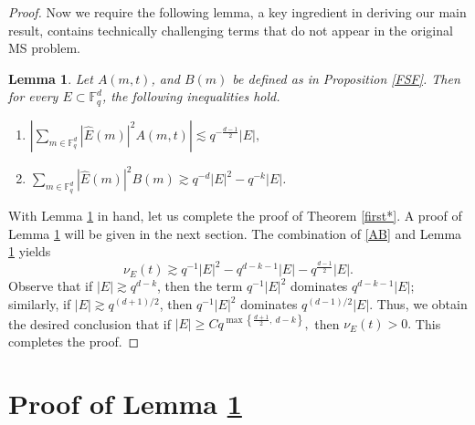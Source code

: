 \documentclass[a4paper,11pt]{amsart}
\numberwithin{equation}{section}
\newtheorem{lemma}[theorem]{Lemma}
\def\Fq#1{\mathbb{F}_q^{#1}}
\def\pnorm#1#2{|#2|_{#1}}
\begin{document}
\begin{proof}
Now we  require the following lemma, a key ingredient in deriving our main result,   contains  technically challenging terms that do not appear in the original MS problem.

\begin{lemma}\label{main} Let $A(m,t)$, and $B(m)$ be defined as in Proposition \ref{FSF}.  Then for every $E \subset \Fq{d}$, the following inequalities hold.
\begin{enumerate}
[label=\textup{(\roman*)}, ref=\textup{(\roman*)}]
\item \label{ABC1} $\left|\displaystyle{\sum_{m\in \Fq{d}}\pnorm{}{\widehat{E}(m)}^2}A(m,t)\right| \lesssim q^{-\frac{d-1}{2}}|E|,$
\item \label{ABC2} $\displaystyle{\sum_{m\in \Fq{d}}\pnorm{}{
\widehat{E}(m)}^2}B(m) \gtrsim q^{-d}|E|^2 - q^{-k}|E|$.
\end{enumerate}
\end{lemma}

With Lemma \ref{main} in hand, let us complete the proof of Theorem \ref{first*}. A proof of Lemma \ref{main} will be given in the next section.
The combination of \eqref{AB} and Lemma \ref{main} yields 
\begin{equation*}
	\nu_E(t) \gtrsim q^{-1}|E|^2 -q^{d-k-1}|E|-q^{\frac{d-1}{2}}|E|.
\end{equation*}
Observe that if \( |E| \gtrsim q^{d-k} \), then the term \( q^{-1}|E|^2 \) dominates \( q^{d-k-1}|E| \); similarly, if \( |E| \gtrsim q^{(d+1)/2} \), then \( q^{-1}|E|^2 \) dominates \( q^{(d-1)/2}|E| \). Thus, we obtain the desired conclusion that 
if $|E| \ge C  q^{\max\left\{ \frac{d+1}{2},\ d - k \right\}},$ then  $\nu_E(t) >0.$
This completes the proof.
\end{proof}

\section{Proof of Lemma \ref{main} }\label{Ch5}
\end{document}

